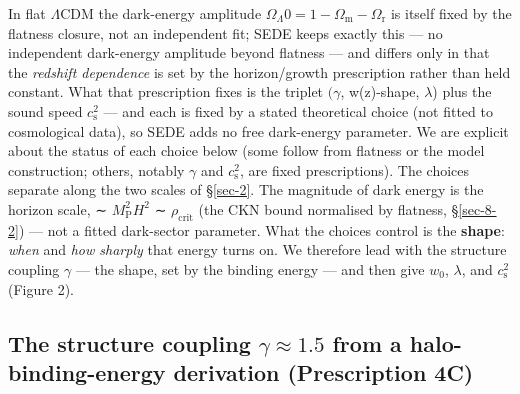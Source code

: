 \documentclass[preprint,12pt]{elsarticle}
\begin{document}
In flat \(\Lambda \mathrm{CDM}\) the dark-energy amplitude
\(\Omega _\Lambda 0 = 1 - \Omega _{\mathrm{m}} - \Omega _{\mathrm{r}}\)
is itself fixed by the flatness closure, not an independent fit; SEDE
keeps exactly this --- no independent dark-energy amplitude beyond
flatness --- and differs only in that the \emph{redshift dependence} is
set by the horizon/growth prescription rather than held constant. What
that prescription fixes is the triplet \((\gamma\), w(z)-shape,
\(\lambda\)) plus the sound speed \(c_{\mathrm{s}}^{2}\) --- and each is
fixed by a stated theoretical choice (not fitted to cosmological data),
so SEDE adds no free dark-energy parameter. We are explicit about the
status of each choice below (some follow from flatness or the model
construction; others, notably \(\gamma\) and \(c_{\mathrm{s}}^{2}\), are
fixed prescriptions). The choices separate along the two scales of
§\ref{sec-2}. The magnitude of dark energy is the horizon scale, ∼
\(M_{\mathrm{P}}^{2}H^{2}\) ∼ \(\rho _{\mathrm{crit}}\) (the CKN bound
normalised by flatness, §\ref{sec-8-2}) --- not a fitted dark-sector
parameter. What the choices control is the \textbf{shape}: \emph{when}
and \emph{how sharply} that energy turns on. We therefore lead with the
structure coupling \(\gamma\) --- the shape, set by the binding energy
--- and then give \(w_{0}\), \(\lambda\), and \(c_{\mathrm{s}}^{2}\)
(Figure 2).

\subsection{\texorpdfstring{The structure coupling
\(\gamma  \approx  1.5\) from a halo-binding-energy derivation
(Prescription
4C)}{The structure coupling \textbackslash gamma  \textbackslash approx  1.5 from a halo-binding-energy derivation (Prescription 4C)}}\label{sec-3-1}
\end{document}
